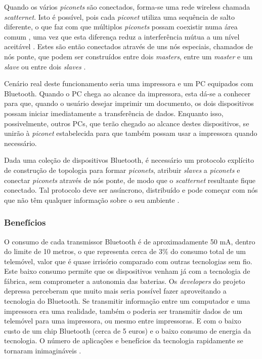 \documentclass[conference]{IEEEtran}
\begin{document}
Quando os vários \textit{piconets} são conectados, forma-se uma rede wireless chamada \textit{scatternet}.
Isto é possível, pois cada \textit{piconet} utiliza uma sequência de salto diferente, o que faz com que múltiplos \textit{piconets} possam coexistir numa área comum \cite{salonidis2005distributed}, uma vez que esta diferença reduz a interferência mútua a um nível aceitável \cite{prasad2004ofdm}. 
Estes são então conectados através de uns nós especiais, chamados de nós ponte, que podem ser construídos entre dois \textit{masters}, entre um \textit{master} e um \textit{slave} ou entre dois \textit{slaves} \cite{salonidis2005distributed}.

Cenário real deste funcionamento seria uma impressora e um PC equipados com Bluetooth. Quando o PC chega ao alcance da impressora, esta dá-se a conhecer para que, quando o usuário desejar imprimir um documento, os dois dispositivos possam iniciar imediatamente a transferência de dados. Enquanto isso, possivelmente, outros PCs, que terão chegado ao alcance destes dispositivos, se unirão à \textit{piconet} estabelecida para que também possam usar a impressora quando necessário.

Dada uma coleção de dispositivos Bluetooth, é necessário um protocolo explícito de construção de topologia para formar \textit{piconets}, atribuir \textit{slaves} a \textit{piconets} e conectar \textit{piconets} através de nós ponte, de modo que o \textit{scatternet} resultante fique conectado. Tal protocolo deve ser assíncrono, distribuído e pode começar com nós que não têm qualquer informação sobre o seu ambiente \cite{salonidis2005distributed}.

\subsubsection{Benefícios}

O consumo de cada transmissor Bluetooth é de aproximadamente 50 mA, dentro do limite de 10 metros, o que representa cerca de 3\% do consumo total de um telemóvel, valor que é quase irrisório comparado com outras tecnologias sem fio. 
Este baixo consumo permite que os dispositivos venham já com a tecnologia de fábrica, sem comprometer a autonomia das baterias. 
Os \textit{developers} do projeto depressa perceberam que muito mais seria possível fazer aproveitando a tecnologia do Bluetooth. 
Se transmitir informação entre um computador e uma impressora era uma realidade, também o poderia ser transmitir dados de um telemóvel para uma impressora, ou mesmo entre impressoras. 
E com o baixo custo de um chip Bluetooth (cerca de 5 euros) e o baixo consumo de energia da tecnologia. 
O número de aplicações e benefícios da tecnologia rapidamente se tornaram inimagináveis \cite{kobayashi2004tecnologia}.
\end{document}
